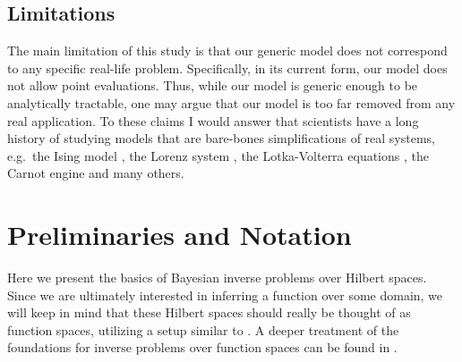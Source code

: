 \documentclass[ba]{imsart}
\theoremstyle{plain}
\theoremstyle{definition}
\theoremstyle{remark}
\begin{document}
\subsection{Limitations}\label{subsec:limitations}
The main limitation of this study is that our generic model does not
correspond to any specific real-life problem. Specifically, in its
current form, our model does not allow point evaluations. Thus, while
our model is generic enough to be analytically tractable, one may
argue that our model is too far removed from any real application. To
these claims I would answer that scientists have a long history of
studying models that are bare-bones simplifications of real systems,
e.g.~the Ising model \cite{cipra1987}, the Lorenz system \cite{brin},
the Lotka-Volterra equations \cite{logan2006}, the Carnot engine
\cite{kardar2007} and many others.
















































 \section{Preliminaries and Notation}\label{section:prelim}
Here we present the basics of Bayesian inverse problems over Hilbert
spaces. Since we are ultimately interested in inferring a function
over some domain, we will keep in mind that these Hilbert spaces
should really be thought of as function spaces, utilizing a setup
similar to \cite{knapik2011}. A deeper treatment of the foundations
for inverse problems over function spaces can be found in
\cite{Stuart10}.
\end{document}
